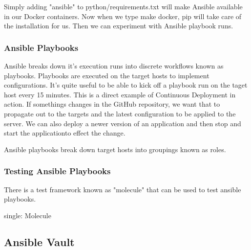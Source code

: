 Simply adding "ansible" to python/requirements.txt will make Ansible
available in our Docker containers. Now when we type make docker, pip
will take care of the installation for us. Then we can experiment with
Ansible playbook runs.

\hypertarget{ansible-playbooks}{%
   \subsubsection{Ansible Playbooks}\label{ansible-playbooks}}

Ansible breaks down it's execution runs into discrete workflows known as
playbooks. Playbooks are executed on the target hosts to implement
configurations. It's quite useful to be able to kick off a playbook run
on the taget host every 15 minutes. This is a direct example of
Continuous Deployment in action. If somethings changes in the GitHub
repository, we want that to propagate out to the targets and the latest
configuration to be applied to the server. We can also deploy a newer
version of an application and then stop and start the applicationto
effect the change.

Ansible playbooks break down target hosts into groupings known as roles.

\hypertarget{testing-ansible-playbooks}{%
   \subsubsection{Testing Ansible
      Playbooks}\label{testing-ansible-playbooks}}

There is a test framework known as "molecule" that can be used to test
ansible playbooks.

single: Molecule

\begin{Shaded}
   \begin{Highlighting}[]
      \NormalTok{$ }
      \ExtensionTok{--}\OperatorTok{>}
   \end{Highlighting}
\end{Shaded}

\hypertarget{ansible-vault}{%
   \subsection{Ansible Vault}\label{ansible-vault}}

